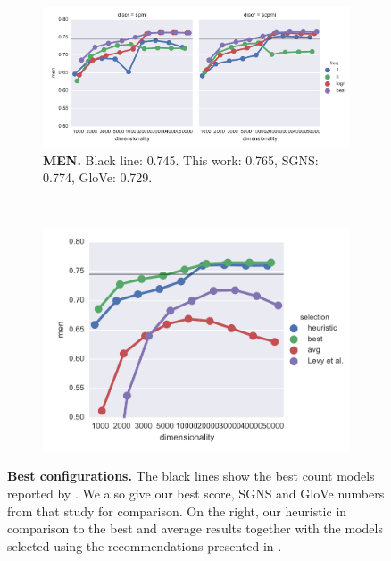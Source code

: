 \begin{figure}
  \begin{subfigure}[t]{0.6\textwidth}
    \includegraphics[width=\textwidth]{supplement/figures/men-best}
    \caption{\scriptsize \textbf{MEN.} Black line: 0.745.
      This work: 0.765,
      SGNS: 0.774,
      GloVe: 0.729.
    }
    \label{fig:best-men}
  \end{subfigure}
  ~
  \begin{subfigure}[t]{0.37\textwidth}
    \includegraphics[width=\textwidth]{supplement/figures/men-global-best}
    \caption{}
    \label{fig:global-best-men}
  \end{subfigure}

  \caption{\small\textbf{Best configurations.} The black lines show the best count models reported by \protect{}. We also give our best score, SGNS and GloVe numbers from that study for comparison. On the right, our heuristic in comparison to the best and average results together with the models selected using the recommendations presented in \protect{}.}
  \label{fig:best}
\end{figure}

